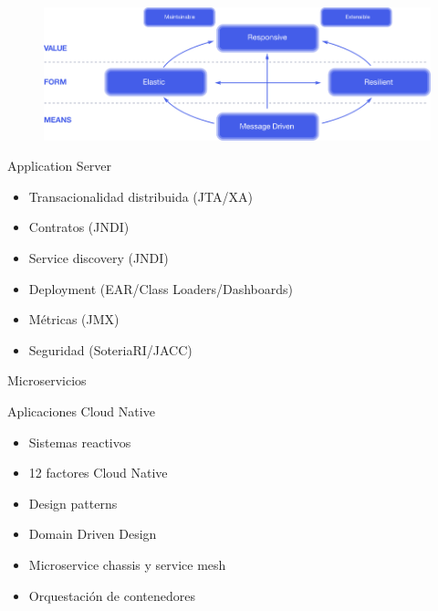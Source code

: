 \documentclass[aspectratio=169]{beamer}
\begin{document}
\begin{frame}{}
	
	\begin{figure}
		\centering
		\includegraphics[width=\linewidth]{Images/reactive-traits.png}
	\end{figure}
	
\end{frame}


\begin{frame}{Application Server}
	
	\begin{itemize}
		\item Transacionalidad distribuida (JTA/XA)
		\item Contratos (JNDI)
		\item Service discovery (JNDI)
		\item Deployment (EAR/Class Loaders/Dashboards)
		\item Métricas (JMX)
		\item Seguridad (SoteriaRI/JACC)
	\end{itemize}
	
\end{frame}



\begin{frame}{Microservicios}
	
	Aplicaciones Cloud Native
	\begin{itemize}
		\item Sistemas reactivos
		\item 12 factores Cloud Native
		\item Design patterns
		\item Domain Driven Design
		\item Microservice chassis y service mesh
		\item Orquestación de contenedores
	\end{itemize}
	
\end{frame}
\end{document}
